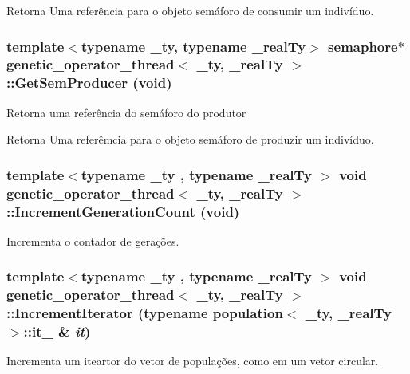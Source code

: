 \begin{DoxyReturn}{Retorna}
Uma referência para o objeto semáforo de consumir um indivíduo. 
\end{DoxyReturn}
\hypertarget{classgenetic__operator__thread_aa9a6e0370bfd3afe316af822832a8013}{
\subsubsection[{GetSemProducer}]{\setlength{\rightskip}{0pt plus 5cm}template$<$typename \_\-ty, typename \_\-realTy$>$ {\bf semaphore}$\ast$ {\bf genetic\_\-operator\_\-thread}$<$ \_\-ty, \_\-realTy $>$::GetSemProducer (void)}}
\label{classgenetic__operator__thread_aa9a6e0370bfd3afe316af822832a8013}
Retorna uma referência do semáforo do produtor

\begin{DoxyReturn}{Retorna}
Uma referêmcia para o objeto semáforo de produzir um indivíduo. 
\end{DoxyReturn}
\hypertarget{classgenetic__operator__thread_a77fb097a6fa283eebe5cf6af08dd2cfc}{
\subsubsection[{IncrementGenerationCount}]{\setlength{\rightskip}{0pt plus 5cm}template$<$typename \_\-ty , typename \_\-realTy $>$ void {\bf genetic\_\-operator\_\-thread}$<$ \_\-ty, \_\-realTy $>$::IncrementGenerationCount (void)}}
\label{classgenetic__operator__thread_a77fb097a6fa283eebe5cf6af08dd2cfc}
Incrementa o contador de gerações. \hypertarget{classgenetic__operator__thread_a856af75479279710968a1aa2b26400de}{
\subsubsection[{IncrementIterator}]{\setlength{\rightskip}{0pt plus 5cm}template$<$typename \_\-ty , typename \_\-realTy $>$ void {\bf genetic\_\-operator\_\-thread}$<$ \_\-ty, \_\-realTy $>$::IncrementIterator (typename {\bf population}$<$ \_\-ty, \_\-realTy $>$::{\bf it\_\-} \& {\em it})}}
\label{classgenetic__operator__thread_a856af75479279710968a1aa2b26400de}
Incrementa um iteartor do vetor de populações, como em um vetor circular.

